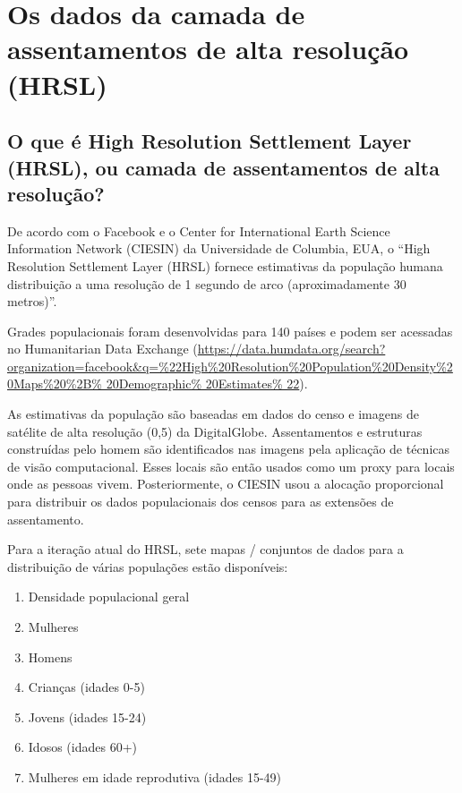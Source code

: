 \documentclass[
  portuguese,
]{krantz}
\providecommand{\tightlist}{%
  \setlength{\itemsep}{0pt}\setlength{\parskip}{0pt}}
\begin{document}
\hypertarget{os-dados-da-camada-de-assentamentos-de-alta-resoluuxe7uxe3o-hrsl}{%
\section{Os dados da camada de assentamentos de alta resolução (HRSL)}\label{os-dados-da-camada-de-assentamentos-de-alta-resoluuxe7uxe3o-hrsl}}

\hypertarget{o-que-uxe9-high-resolution-settlement-layer-hrsl-ou-camada-de-assentamentos-de-alta-resoluuxe7uxe3o}{%
\subsection{\texorpdfstring{\textbf{O que é High Resolution Settlement Layer (HRSL), ou camada de assentamentos de alta resolução?}}{O que é High Resolution Settlement Layer (HRSL), ou camada de assentamentos de alta resolução?}}\label{o-que-uxe9-high-resolution-settlement-layer-hrsl-ou-camada-de-assentamentos-de-alta-resoluuxe7uxe3o}}

De acordo com o Facebook e o Center for International Earth Science Information Network (CIESIN) da Universidade de Columbia, EUA, o ``High Resolution Settlement Layer (HRSL) fornece estimativas da população humana distribuição a uma resolução de 1 segundo de arco (aproximadamente 30 metros)''.

Grades populacionais foram desenvolvidas para 140 países e podem ser acessadas no Humanitarian Data Exchange (\href{https://data.humdata.org/search?organization=facebook\&q=\%22High\%20Resolution\%20Population\%20Density\%20Maps\%20\%2B\%20Demographic\%20Estimates\%22}{https://data.humdata.org/search?organization=facebook\&q=\%22High\%20Resolution\%20Population\%20Density\%20Maps\%20\%2B\% 20Demographic\% 20Estimates\% 22}).

As estimativas da população são baseadas em dados do censo e imagens de satélite de alta resolução (0,5) da DigitalGlobe. Assentamentos e estruturas construídas pelo homem são identificados nas imagens pela aplicação de técnicas de visão computacional. Esses locais são então usados como um proxy para locais onde as pessoas vivem. Posteriormente, o CIESIN usou a alocação proporcional para distribuir os dados populacionais dos censos para as extensões de assentamento.

Para a iteração atual do HRSL, sete mapas / conjuntos de dados para a distribuição de várias populações estão disponíveis:

\begin{enumerate}
\def\labelenumi{\arabic{enumi}.}
\tightlist
\item
  Densidade populacional geral
\item
  Mulheres
\item
  Homens
\item
  Crianças (idades 0-5)
\item
  Jovens (idades 15-24)
\item
  Idosos (idades 60+)
\item
  Mulheres em idade reprodutiva (idades 15-49)
\end{enumerate}
\end{document}
